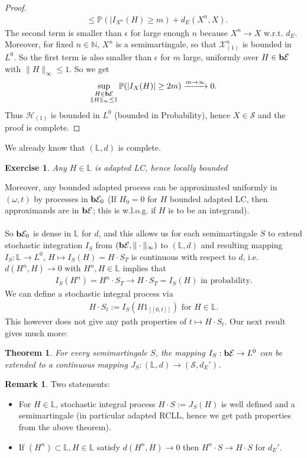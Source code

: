 \documentclass[12pt,a4paper, twoside]{article}
\newtheorem{thm}{Theorem}[section]
\newtheorem{exe}{Exercise}[section]
\theoremstyle{definition}
\newtheorem{rem}{Remark}[section]
\newcommand{\PP}{\mathbb{P}} %
\newcommand{\simple}{\textbf{\text{b}}\mathcal{E}}
\begin{document}
\begin{proof}
\begin{align*}
& \leq \PP(|I_{X^n}(H) \geq m) + d_E(X^n,X).
\end{align*}
The second term is smaller than $\epsilon$ for large enough $n$ because $X^n \to X$ w.r.t. $d_E$. Moreover, for fixed $n \in \mathbb{N}$, $X^n$ is a semimartingale, so that $ \mathcal{X}_{(1)}^n$ is bounded in $L^0$. So the first term is also smaller than $\epsilon$ for $m$ large, uniformly over $H \in \simple$ with $\|H\|_\infty \leq 1$. So we get 
\begin{align*}
\sup_{\substack{H \in \simple \\ \|H\|_\infty \leq 1}} \PP( |I_X(H)| \geq 2m) \xrightarrow{m \to \infty} 0. 
\end{align*}
Thus $\mathcal{H}_{(1)}$ is bounded in $L^0$ (bounded in Probability), hence $X \in \mathcal{S}$ and the proof is complete. 
\end{proof}
We already know that $( \mathbb{L},d)$ is complete. 
\begin{exe} Any $H \in \mathbb{L}$ is adapted LC, hence locally bounded
\end{exe}
Moreover, any bounded adapted process can be approximated uniformly in $( \omega, t)$ by processes in $\simple_0$ (If $H_0=0$ for $H $ bounded adapted LC, then approximands are in $\simple$; this is w.l.o.g. if $H$ is to be an integrand). \\
\\
So $\simple_0$ is dense in $\mathbb{L}$ for $d$, and this allows us for each semimartingale $S$ to extend stochastic integration $I_S$ from $( \simple , \| \cdot \|_\infty)$ to $( \mathbb{L},d)$ and resulting mapping $I_S: \mathbb{L} \to L^0$, $H \mapsto I_S(H)=H \cdot S_T$ is continuous with respect to $d$, i.e. $d(H^n,  H) \to 0$ with $H^n, H \in \mathbb{L}$ implies that 
\begin{align*}
I_S(H^n)= H^n \cdot S_T \to H \cdot S_T = I_S(H) \text{ in probability.}
\end{align*}
We can define a stochastic integral process via  
\begin{align*}
H \cdot S_t := I_S(H 1_{[\![ 0,t]\!]}) \text{ for } H \in \mathbb{L}.
\end{align*}
This however does not give any path properties of $t \mapsto H \cdot S_t$. Our next result gives much more:
\begin{thm}\label{T35} For every semimartingale $S$, the mapping $I_S: \simple \to L^0$ can be extended to a continuous mapping $J_S:( \mathbb{L},d) \to ( \mathcal{S}, d_E')$. 
\end{thm}
\begin{rem} Two statements:
\begin{itemize}
\item For $H \in \mathbb{L}$, stochastic integral process $H \cdot S:= J_S(H)$ is well defined and a semimartingale (in particular adapted RCLL, hence we get path properties from the above theorem).
\item If $(H^n) \subset \mathbb{L},  H \in \mathbb{L}$ satisfy $d(H^n, H) \to 0$ then $H^n \cdot S \to H \cdot S$ for $d_E'$. 
\end{itemize}
\end{rem}
\end{document}
